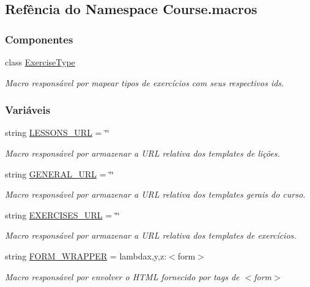 \hypertarget{namespaceCourse_1_1macros}{}\subsection{Refência do Namespace Course.\+macros}
\label{namespaceCourse_1_1macros}
\subsubsection*{Componentes}
\begin{DoxyCompactItemize}
\item 
class \hyperlink{classCourse_1_1macros_1_1ExerciseType}{Exercise\+Type}
\begin{DoxyCompactList}\small\item\em Macro responsável por mapear tipos de exercícios com seus respectivos ids. \end{DoxyCompactList}\end{DoxyCompactItemize}
\subsubsection*{Variáveis}
\begin{DoxyCompactItemize}
\item 
string \hyperlink{namespaceCourse_1_1macros_a4473a418de016b59cce33b13440e469b}{L\+E\+S\+S\+O\+N\+S\+\_\+\+U\+R\+L} = \char`\"{}\char`\"{}
\begin{DoxyCompactList}\small\item\em Macro responsável por armazenar a U\+R\+L relativa dos templates de lições. \end{DoxyCompactList}\item 
string \hyperlink{namespaceCourse_1_1macros_a9a69c2455c0c121b1c01960629575d7e}{G\+E\+N\+E\+R\+A\+L\+\_\+\+U\+R\+L} = \char`\"{}\char`\"{}
\begin{DoxyCompactList}\small\item\em Macro responsável por armazenar a U\+R\+L relativa dos templates gerais do curso. \end{DoxyCompactList}\item 
string \hyperlink{namespaceCourse_1_1macros_ac1cf8b3a78128ab6a3bac4f6be9fabbd}{E\+X\+E\+R\+C\+I\+S\+E\+S\+\_\+\+U\+R\+L} = \char`\"{}\char`\"{}
\begin{DoxyCompactList}\small\item\em Macro responsável por armazenar a U\+R\+L relativa dos templates de exercícios. \end{DoxyCompactList}\item 
string \hyperlink{namespaceCourse_1_1macros_a39e2016892066b4da954490ccc32533e}{F\+O\+R\+M\+\_\+\+W\+R\+A\+P\+P\+E\+R} = lambdax,y,z\+:\textquotesingle{}$<$form$>$\textquotesingle{}
\begin{DoxyCompactList}\small\item\em Macro responsável por envolver o H\+T\+M\+L fornecido por tags de $<$form$>$ \end{DoxyCompactList}\end{DoxyCompactItemize}


